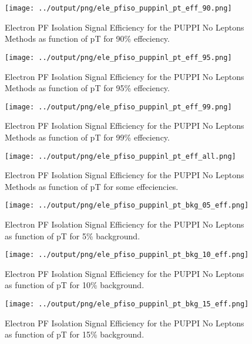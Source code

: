 \documentclass[11pt]{book}
\begin{document}
\begin{figure}[htb]
\centering
\texttt{[image: ../output/png/ele\_pfiso\_puppinl\_pt\_eff\_90.png]}
\caption{Electron PF Isolation Signal Efficiency for the PUPPI No Leptons Methods as function of pT for 90\% effeciency.}
\label{fig:ele_pfiso_pt_eff_puppinl_eff_90}
\end{figure}

\begin{figure}[htb]
\centering
\texttt{[image: ../output/png/ele\_pfiso\_puppinl\_pt\_eff\_95.png]}
\caption{Electron PF Isolation Signal Efficiency for the PUPPI No Leptons Methods as function of pT for 95\% effeciency.}
\label{fig:ele_pfiso_pt_eff_puppinl_eff_95}
\end{figure}

\begin{figure}[htb]
\centering
\texttt{[image: ../output/png/ele\_pfiso\_puppinl\_pt\_eff\_99.png]}
\caption{Electron PF Isolation Signal Efficiency for the PUPPI No Leptons Methods as function of pT for 99\% effeciency.}
\label{fig:ele_pfiso_pt_eff_puppinl_eff_99}
\end{figure}

\begin{figure}[htb]
\centering
\texttt{[image: ../output/png/ele\_pfiso\_puppinl\_pt\_eff\_all.png]}
\caption{Electron PF Isolation Signal Efficiency for the PUPPI No Leptons Methods as function of pT for some effeciencies.}
\label{fig:ele_pfiso_pt_eff_puppinl_eff_all}
\end{figure}

\begin{figure}[htb]
\centering
\texttt{[image: ../output/png/ele\_pfiso\_puppinl\_pt\_bkg\_05\_eff.png]}
\caption{Electron PF Isolation Signal Efficiency for the PUPPI No Leptons as function of pT for 5\% background.}
\label{fig:ele_pfiso_pt_bkg_puppinl_bkg_05_eff}
\end{figure}

\begin{figure}[htb]
\centering
\texttt{[image: ../output/png/ele\_pfiso\_puppinl\_pt\_bkg\_10\_eff.png]}
\caption{Electron PF Isolation Signal Efficiency for the PUPPI No Leptons as function of pT for 10\% background.}
\label{fig:ele_pfiso_pt_bkg_puppinl_bkg_10_eff}
\end{figure}

\begin{figure}[htb]
\centering
\texttt{[image: ../output/png/ele\_pfiso\_puppinl\_pt\_bkg\_15\_eff.png]}
\caption{Electron PF Isolation Signal Efficiency for the PUPPI No Leptons as function of pT for 15\% background.}
\label{fig:ele_pfiso_pt_bkg_puppinl_bkg_15_eff}
\end{figure}
\end{document}
